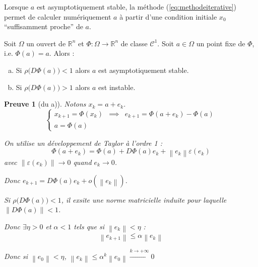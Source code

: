 \documentclass[a4paper,11pt]{article}
\newcommand{\R}{\mathbb{R}}
\newcommand{\norm}[1]{\left\lVert#1\right\rVert}
\theoremstyle{plain} %
\newtheorem{preuve}{Preuve}
\begin{document}
Lorsque $a$ est asymptotiquement stable, la méthode (\ref{eq:methodeiterative}) permet de calculer numériquement $a$ à partir d'une condition initiale $x_0$ ``suffisamment proche'' de $a$.

\begin{ftheo}
    Soit $\Omega$ un ouvert de $\R^n$ et $\Phi : \Omega \longrightarrow \R^n$ de classe $\mathcal{C}^1$.
    Soit $a \in \Omega$ un point fixe de $\Phi$, i.e. $\Phi(a) = a$. Alors :
    \begin{enumerate}[a)]
        \item Si $\rho \Big(D\Phi(a) \Big) < 1$ alors $a$ est asymptotiquement stable.
        \item Si $\rho \Big(D\Phi(a) \Big) > 1$ alors $a$ est instable.
    \end{enumerate}
\end{ftheo}


\begin{preuve}[du a)]
    Notons $x_k = a + e_k$.
    \begin{equation*}
        \left\lbrace
        \begin{array}{ccc}
            x_{k+1} = \Phi (x_k) & \implies & e_{k+1} = \Phi(a+e_k) - \Phi(a) \\
            a = \Phi(a)
        \end{array}
        \right.
    \end{equation*}

    On utilise un développement de Taylor à l'ordre 1 :
    \[
        \Phi(a+e_k) = \Phi(a) + D\Phi(a) e_k + \norm{e_k}\varepsilon(e_k)
    \]
    avec $\norm{\varepsilon(e_k)} \to 0$ quand $e_k \to 0$.


    \vspace{0.5cm}
    Donc $e_{k+1} = D\Phi(a) e_k + o(\norm{e_k})$.

    Si $\rho \big(D\Phi(a) \big) < 1$, il exsite une norme matricielle induite pour
laquelle $\norm{D\Phi(a)}<1$.

    Donc $\exists \eta > 0$ et $\alpha < 1$ tels que si $\norm{e_k} < \eta$ :
    \[
        \norm{e_{k+1}} \leq \alpha \norm{e_k}
    \]

    Donc si $\norm{e_0} < \eta$, $\norm{e_k} \leq \alpha^k \norm{e_0} \xrightarrow{k \to +\infty}0$
\end{preuve}
\end{document}

